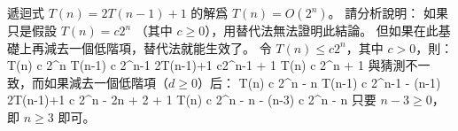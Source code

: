 \startEXERCISE
遞迴式 $T(n)=2T(n-1)+1$ 的解爲 $T(n)=O(2^n)$。
請分析說明：
如果只是假設 $T(n)=c 2^n$ （其中 $c\ge 0$），用替代法無法證明此結論。
但如果在此基礎上再減去一個低階項，替代法就能生效了。
\stopEXERCISE
\startANSWER
令 $T(n)\le c 2^n$，其中 $c>0$，則：
\startsplitformula\startmathalignment
\NC T(n) \NC \le c 2^n \NR
\NC T(n-1) \NC \le c 2^{n-1} \NR
\NC 2T(n-1)+1 \NC {} c2^{n-1} + 1 \NR
\NC T(n) \NC \le c 2^n + 1 \NR
\stopmathalignment\stopsplitformula
與猜測不一致，而如果減去一個低階項（$d\ge 0$）后：
\startsplitformula\startmathalignment
\NC T(n) \NC \le c 2^n - n \NR
\NC T(n-1) \NC \le c 2^{n-1} - (n-1) \NR
\NC 2T(n-1)+1 \NC \le c 2^n - 2n + 2 + 1 \NR
\NC T(n) \NC \le c 2^n - n - (n-3) \le c 2^n - n \NR
\stopmathalignment\stopsplitformula
只要 $n-3\ge 0$，即 $n\ge 3$ 即可。
\stopANSWER

\stopsection
